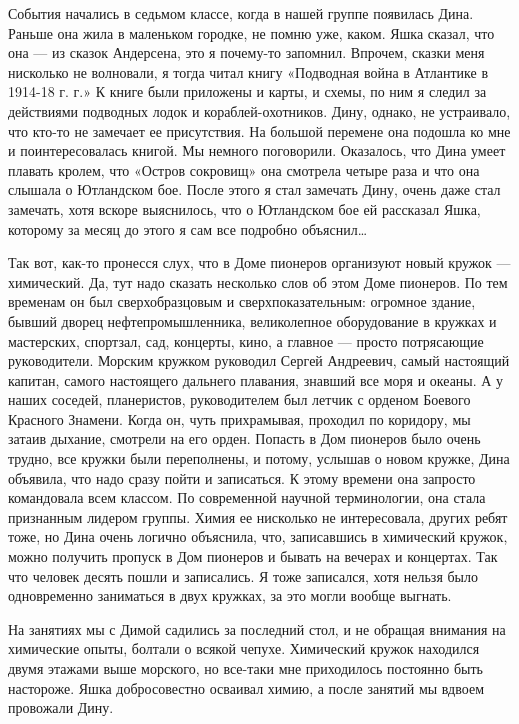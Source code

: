 События  начались в  седьмом классе,  когда в  нашей группе  появилась
Дина. Раньше она  жила в маленьком городке, не помню  уже, каком. Яшка
сказал,  что она  — из  сказок  Андерсена, это  я почему-то  запомнил.
Впрочем,  сказки меня  нисколько  не волновали,  я  тогда читал  книгу
«Подводная война в Атлантике в 1914-18 г. г.» К книге были приложены и
карты,  и  схемы,  по  ним  я следил  за  действиями  подводных  лодок
и  кораблей-охотников.  Дину, однако,  не  устраивало,  что кто-то  не
замечает  ее присутствия.  На большой  перемене она  подошла ко  мне и
поинтересовалась книгой.  Мы немного  поговорили. Оказалось,  что Дина
умеет плавать кролем, что «Остров сокровищ» она смотрела четыре раза и
что она  слышала о Ютландском бое.  После этого я стал  замечать Дину,
очень даже стал замечать, хотя вскоре выяснилось, что о Ютландском бое
ей  рассказал Яшка,  которому за  месяц до  этого я  сам все  подробно
объяснил…

Так  вот,  как-то  пронесся  слух,  что  в  Доме  пионеров  организуют
новый  кружок  —  химический.  Да, тут  надо  сказать  несколько  слов
об  этом Доме  пионеров.  По  тем временам  он  был сверхобразцовым  и
сверхпоказательным: огромное здание, бывший дворец нефтепромышленника,
великолепное  оборудование  в  кружках и  мастерских,  спортзал,  сад,
концерты, кино,  а главное — просто  потрясающие руководители. Морским
кружком руководил  Сергей Андреевич,  самый настоящий  капитан, самого
настоящего дальнего  плавания, знавший  все моря и  океаны. А  у наших
соседей,  планеристов,  руководителем  был летчик  с  орденом  Боевого
Красного Знамени. Когда он, чуть прихрамывая, проходил по коридору, мы
затаив дыхание,  смотрели на  его орден. Попасть  в Дом  пионеров было
очень трудно, все  кружки были переполнены, и потому,  услышав о новом
кружке,  Дина объявила,  что надо  сразу пойти  и записаться.  К этому
времени она запросто командовала  всем классом. По современной научной
терминологии, она стала признанным  лидером группы. Химия ее нисколько
не интересовала, других  ребят тоже, но Дина  очень логично объяснила,
что, записавшись  в химический  кружок, можно  получить пропуск  в Дом
пионеров  и бывать  на вечерах  и  концертах. Так  что человек  десять
пошли и  записались. Я тоже  записался, хотя нельзя  было одновременно
заниматься в двух кружках, за это могли вообще выгнать.

На занятиях мы с Димой садились  за последний стол, и не обращая  внимания
на химические опыты, болтали о всякой чепухе. Химический кружок  находился
двумя этажами выше  морского, но все-таки  мне приходилось постоянно  быть
настороже. Яшка добросовестно  осваивал химию, а  после занятий мы  вдвоем
провожали Дину.

